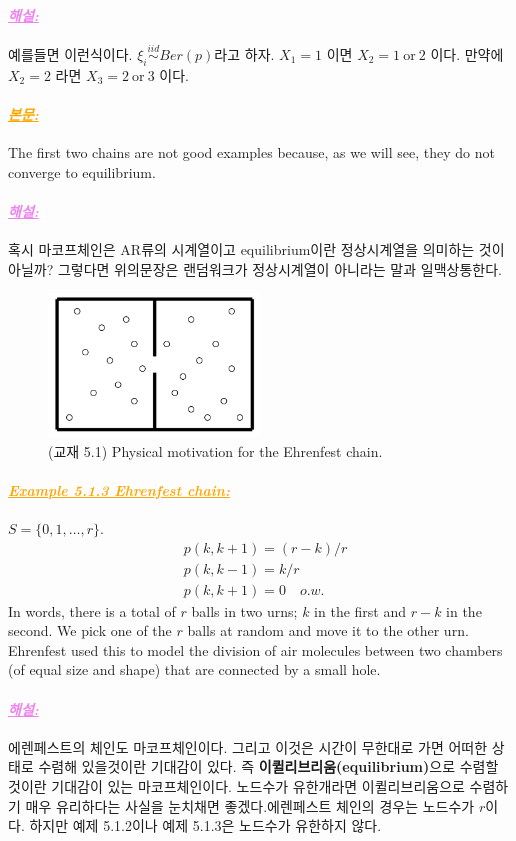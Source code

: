 \documentclass[12pt,oneside,english,a4paper]{article}
\newcommand{\paraviolet}[1]{\paragraph{\LARGE\textcolor{violet}{\it\underline{\textbf{#1:}}}}\LARGE}
\newcommand{\paraorange}[1]{\paragraph{\LARGE\textcolor{orange}{\it\underline{\textbf{#1:}}}}\LARGE}
\begin{document}
\paraviolet{해설} 예를들면 이런식이다. $\xi_i \overset{iid}{\sim} Ber(p)$라고 하자. $X_1=1$ 이면 $X_2=1 ~ \mbox{or}~ 2$ 이다. 만약에 $X_2=2$ 라면 $X_3=2 ~\mbox{or}~ 3$ 이다. 

\paraorange{본문} The first two chains are not good examples because, as we will see,
they do not converge to equilibrium.

\paraviolet{해설} 혹시 마코프체인은 AR류의 시계열이고 equilibrium이란 정상시계열을 의미하는 것이 아닐까? 그렇다면 위의문장은 랜덤워크가 정상시계열이 아니라는 말과 일맥상통한다. 


\begin{figure}[ht]
\center
\includegraphics[width=0.5\textwidth]{Fig51.png}
\caption{(교재 5.1) Physical motivation for the Ehrenfest chain.}
\end{figure}

\paraorange{Example 5.1.3 Ehrenfest chain} 

$S=\{0,1,\dots,r\}$. 
\begin{align*}
& p(k,k+1)=(r-k)/r \\ 
& p(k,k-1)=k/r \\ 
& p(k,k+1)=0 \quad o.w.
\end{align*}
In words, there is a total of $r$ balls in two urns; $k$ in the first and $r-k$ in the second. We pick one of the $r$ balls at random and move it to the other urn. Ehrenfest used this to model the division of air molecules between two chambers (of equal size and shape) that are connected by a small
hole.

\paraviolet{해설} 에렌페스트의 체인도 마코프체인이다. 그리고 이것은 시간이 무한대로 가면 어떠한 상태로 수렴해 있을것이란 기대감이 있다. 즉 \textbf{이퀼리브리움(equilibrium)}으로 수렴할 것이란 기대감이 있는 마코프체인이다. 노드수가 유한개라면 이퀼리브리움으로 수렴하기 매우 유리하다는 사실을 눈치채면 좋겠다.에렌페스트 체인의 경우는 노드수가 $r$이다. 하지만 예제 5.1.2이나 예제 5.1.3은 노드수가 유한하지 않다. 
\end{document}

